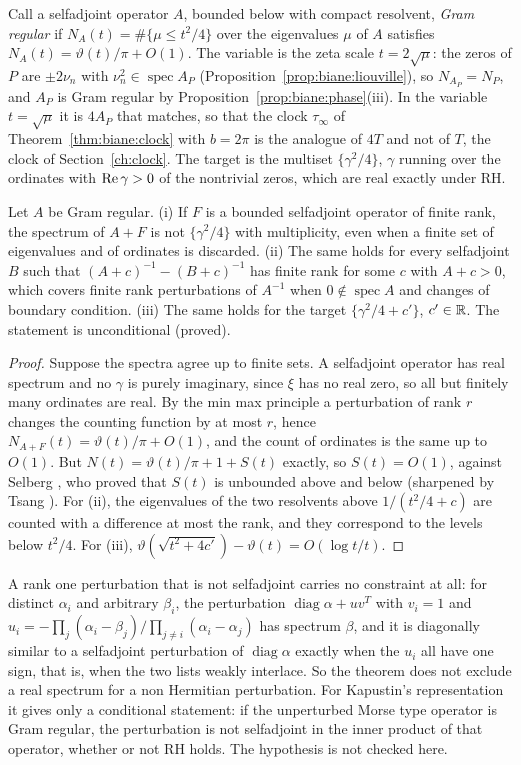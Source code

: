 Call a selfadjoint operator $A$, bounded below with compact resolvent, \emph{Gram regular} if $N_A(t)=\#\{\mu\le t^2/4\}$ over the eigenvalues $\mu$ of $A$ satisfies $N_A(t)=\vartheta(t)/\pi+O(1)$. The variable is the zeta scale $t=2\sqrt\mu$: the zeros of $P$ are $\pm2\nu_n$ with $\nu_n^2\in\operatorname{spec}A_P$ (Proposition~\ref{prop:biane:liouville}), so $N_{A_P}=N_P$, and $A_P$ is Gram regular by Proposition~\ref{prop:biane:phase}(iii). In the variable $t=\sqrt\mu$ it is $4A_P$ that matches, so that the clock $\tau_\infty$ of Theorem~\ref{thm:biane:clock} with $b=2\pi$ is the analogue of $4T$ and not of $T$, the clock of Section~\ref{ch:clock}. The target is the multiset $\{\gamma^2/4\}$, $\gamma$ running over the ordinates with $\operatorname{Re}\gamma>0$ of the nontrivial zeros, which are real exactly under RH.

\begin{theorem}\label{thm:biane:nogo}
Let $A$ be Gram regular. (i) If $F$ is a bounded selfadjoint operator of finite rank, the spectrum of $A+F$ is not $\{\gamma^2/4\}$ with multiplicity, even when a finite set of eigenvalues and of ordinates is discarded. (ii) The same holds for every selfadjoint $B$ such that $(A+c)^{-1}-(B+c)^{-1}$ has finite rank for some $c$ with $A+c>0$, which covers finite rank perturbations of $A^{-1}$ when $0\notin\operatorname{spec}A$ and changes of boundary condition. (iii) The same holds for the target $\{\gamma^2/4+c'\}$, $c'\in\mathbb{R}$. The statement is unconditional (proved).
\end{theorem}

\begin{proof}
Suppose the spectra agree up to finite sets. A selfadjoint operator has real spectrum and no $\gamma$ is purely imaginary, since $\xi$ has no real zero, so all but finitely many ordinates are real. By the min max principle a perturbation of rank $r$ changes the counting function by at most $r$, hence $N_{A+F}(t)=\vartheta(t)/\pi+O(1)$, and the count of ordinates is the same up to $O(1)$. But $N(t)=\vartheta(t)/\pi+1+S(t)$ exactly, so $S(t)=O(1)$, against Selberg \cite{Selberg46}, who proved that $S(t)$ is unbounded above and below (sharpened by Tsang \cite{Tsang}). For (ii), the eigenvalues of the two resolvents above $1/(t^2/4+c)$ are counted with a difference at most the rank, and they correspond to the levels below $t^2/4$. For (iii), $\vartheta(\sqrt{t^2+4c'})-\vartheta(t)=O(\log t/t)$.
\end{proof}

A rank one perturbation that is not selfadjoint carries no constraint at all: for distinct $\alpha_i$ and arbitrary $\beta_i$, the perturbation $\operatorname{diag}\alpha+uv^{T}$ with $v_i=1$ and $u_i=-\prod_j(\alpha_i-\beta_j)/\prod_{j\ne i}(\alpha_i-\alpha_j)$ has spectrum $\beta$, and it is diagonally similar to a selfadjoint perturbation of $\operatorname{diag}\alpha$ exactly when the $u_i$ all have one sign, that is, when the two lists weakly interlace. So the theorem does not exclude a real spectrum for a non Hermitian perturbation. For Kapustin's representation it gives only a conditional statement: if the unperturbed Morse type operator is Gram regular, the perturbation is not selfadjoint in the inner product of that operator, whether or not RH holds. The hypothesis is not checked here.

